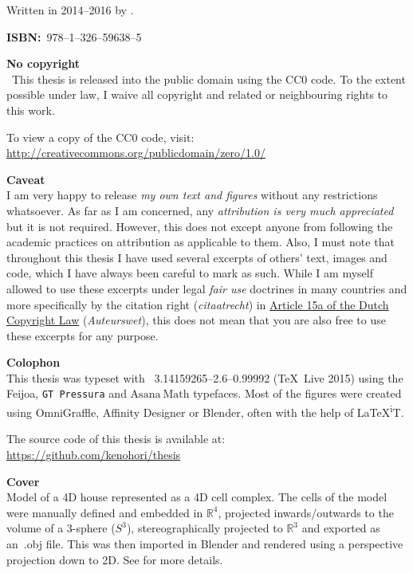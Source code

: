 

\clearpage
\thispagestyle{empty}
\null%
\label{thesis:colophon}
\vfill
{}
Written in 2014--2016 by
{\makeatletter
\href{http://ken.mx}{\@author}%
\makeatother}.

\textbf{ISBN:}\ 978--1--326--59638--5

\textbf{No copyright}\\
\cczero\ This thesis is released into the public domain using the CC0 code.
To the extent possible under law, I waive all copyright and related or neighbouring rights to this work.

To view a copy of the CC0 code, visit: \\
\url{http://creativecommons.org/publicdomain/zero/1.0/}

\textbf{Caveat} \\
I am very happy to release \emph{my own text and figures} without any restrictions whatsoever.
As far as I am concerned, any \emph{attribution is very much appreciated} but it is not required.
However, this does not except anyone from following the academic practices on attribution as applicable to them.
Also, I must note that throughout this thesis I have used several excerpts of others' text, images and code, which I have always been careful to mark as such.
While I am myself allowed to use these excerpts under legal \emph{fair use} doctrines in many countries and more specifically by the citation right (\emph{citaatrecht}) in \href{http://wetten.overheid.nl/jci1.3:c:BWBR0001886&hoofdstuk=I&paragraaf=6&artikel=15a&z=2015-07-01&g=2015-07-01}{Article 15a of the Dutch Copyright Law} (\emph{Auteurswet}), this does not mean that you are also free to use these excerpts for any purpose.

\textbf{Colophon} \\
This thesis was typeset with \XeTeX\ 3.14159265--2.6--0.99992 (\TeX\ Live 2015) using the \mbox{{\fanciestfont{}Feijoa}}, \texttt{GT Pressura} and $\mathrm{Asana\ Math}$ typefaces.
Most of the figures were created using OmniGraffle, Affinity Designer or Blender, often with the help of \LaTeX{}\textsuperscript{i}T.

The source code of this thesis is available at: \\
\url{https://github.com/kenohori/thesis}

\textbf{Cover} \\
Model of a 4D house represented as a 4D cell complex.
The cells of the model were manually defined and embedded in $\mathbb{R}^4$, projected inwards/outwards to the volume of a 3-sphere ($S^3$), stereographically projected to $\mathbb{R}^3$ and exported as an\ {}.obj file.
This was then imported in Blender and rendered using a perspective projection down to 2D.
See  for more details.

